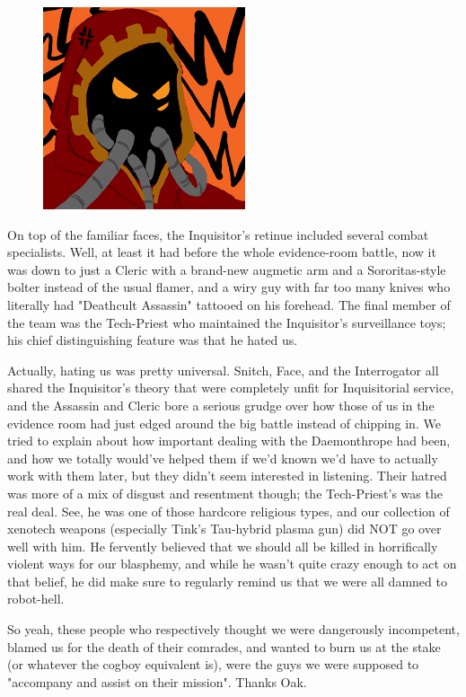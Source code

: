 \begin{figure}
	\begin{center}
		\includegraphics[width=\figwidth]{pics/17/15.png}
	\end{center}
\end{figure}
On top of the familiar faces, the Inquisitor's retinue included several combat specialists. 
Well, at least it had before the whole evidence-room battle, now it was down to just a Cleric with a brand-new augmetic arm and a Sororitas-style bolter instead of the usual flamer, and a wiry guy with far too many knives who literally had "Deathcult Assassin" tattooed on his forehead. 
The final member of the team was the Tech-Priest who maintained the Inquisitor's surveillance toys; 
his chief distinguishing feature was that he hated us.

Actually, hating us was pretty universal. 
Snitch, Face, and the Interrogator all shared the Inquisitor's theory that were completely unfit for Inquisitorial service, and the Assassin and Cleric bore a serious grudge over how those of us in the evidence room had just edged around the big battle instead of chipping in. 
We tried to explain about how important dealing with the Daemonthrope had been, and how we totally would've helped them if we'd known we'd have to actually work with them later, but they didn't seem interested in listening. 
Their hatred was more of a mix of disgust and resentment though; 
the Tech-Priest's was the real deal. 
See, he was one of those hardcore religious types, and our collection of xenotech weapons (especially Tink's Tau-hybrid plasma gun) did NOT go over well with him. 
He fervently believed that we should all be killed in horrifically violent ways for our blasphemy, and while he wasn't quite crazy enough to act on that belief, he did make sure to regularly remind us that we were all damned to robot-hell.

So yeah, these people who respectively thought we were dangerously incompetent, blamed us for the death of their comrades, and wanted to burn us at the stake (or whatever the cogboy equivalent is), were the guys we were supposed to "accompany and assist on their mission". 
Thanks Oak.

